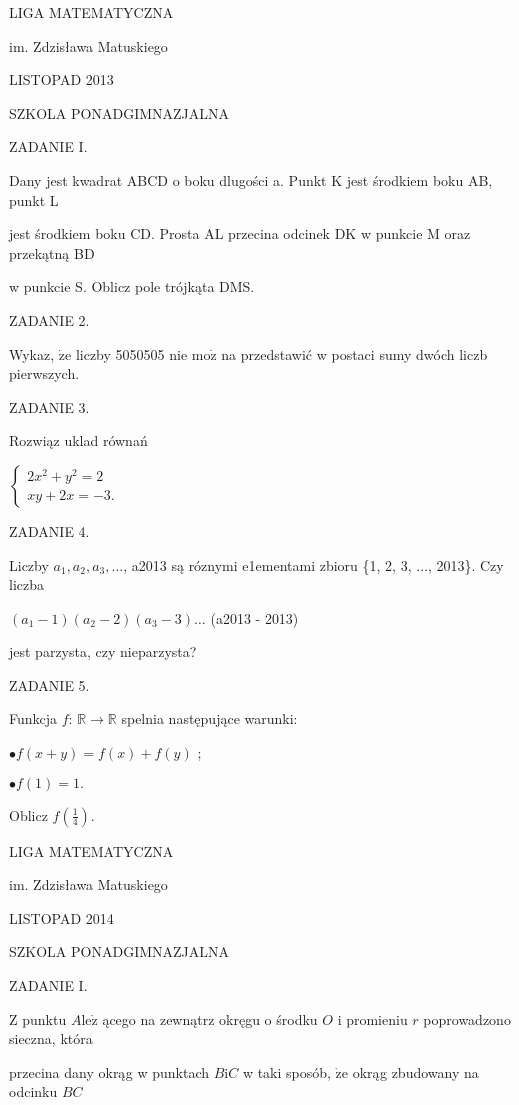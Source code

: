\documentclass[a4paper,12pt]{article}
\begin{document}
LIGA MATEMATYCZNA

im. Zdzisława Matuskiego

LISTOPAD 2013

SZKOLA PONADGIMNAZJALNA

ZADANIE I.

Dany jest kwadrat ABCD o boku dlugości a. Punkt K jest środkiem boku AB, punkt L

jest środkiem boku CD. Prosta AL przecina odcinek DK w punkcie M oraz przekątną BD

w punkcie S. Oblicz pole trójkąta DMS.

ZADANIE 2.

Wykaz, $\dot{\mathrm{z}}\mathrm{e}$ liczby 5050505 nie $\mathrm{m}\mathrm{o}\dot{\mathrm{z}}$ na przedstawić w postaci sumy dwóch liczb pierwszych.

ZADANIE 3.

Rozwiąz uklad równań

$\left\{\begin{array}{l}
2x^{2}+y^{2}=2\\
xy+2x=-3.
\end{array}\right.$

ZADANIE 4.

Liczby $a_{1}, a_{2}, a_{3}, \ldots$, a2013 są róznymi e1ementami zbioru \{1, 2, 3, $\ldots$, 2013\}. Czy liczba

$(a_{1}-1)(a_{2}-2)(a_{3}-3)\ldots$ (a2013 - 2013)

jest parzysta, czy nieparzysta?

ZADANIE 5.

Funkcja $f$: $\mathbb{R}\rightarrow \mathbb{R}$ spelnia następujące warunki:

$\bullet f(x+y)=f(x)+f(y)$ ;

$\bullet f(1)=1.$

Oblicz $f(\displaystyle \frac{1}{4}).$






LIGA MATEMATYCZNA

im. Zdzisława Matuskiego

LISTOPAD 2014

SZKOLA PONADGIMNAZJALNA

ZADANIE I.

$\mathrm{Z}$ punktu $A\mathrm{l}\mathrm{e}\dot{\mathrm{z}}$ ącego na zewnątrz okręgu o środku $O$ i promieniu $r$ poprowadzono sieczna, która

przecina dany okrąg w punktach $B\mathrm{i}C$ w taki sposób, $\dot{\mathrm{z}}\mathrm{e}$ okrąg zbudowany na odcinku $BC$
\end{document}
